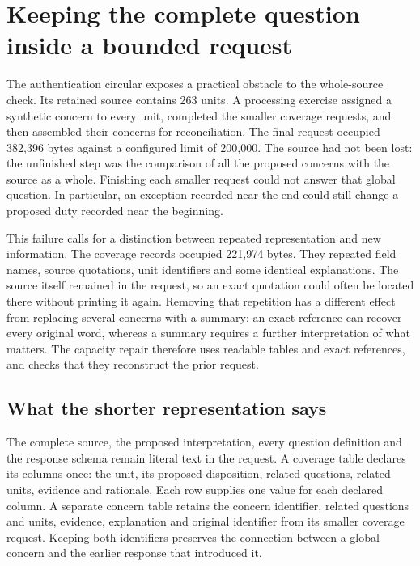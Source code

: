 \section{Keeping the complete question inside a bounded request}
\label{sec:lossless-context}

The authentication circular exposes a practical obstacle to the whole-source
check. Its retained source contains 263 units. A processing exercise assigned a
synthetic concern to every unit, completed the smaller coverage requests, and
then assembled their concerns for reconciliation. The final request occupied
382,396 bytes against a configured limit of 200,000. The source had not been
lost: the unfinished step was the comparison of all the proposed concerns with
the source as a whole. Finishing each smaller request could not answer that
global question. In particular, an exception recorded near the end could still
change a proposed duty recorded near the beginning.

This failure calls for a distinction between repeated representation and new
information. The coverage records occupied 221,974 bytes. They repeated field
names, source quotations, unit identifiers and some identical explanations.
The source itself remained in the request, so an exact quotation could often be
located there without printing it again. Removing that repetition has a
different effect from replacing several concerns with a summary: an exact
reference can recover every original word, whereas a summary requires a further
interpretation of what matters. The capacity repair therefore uses readable
tables and exact references, and checks that they reconstruct the prior request.

\subsection{What the shorter representation says}

The complete source, the proposed interpretation, every question definition and
the response schema remain literal text in the request. A coverage table
declares its columns once: the unit, its proposed disposition, related questions,
related units, evidence and rationale. Each row supplies one value for each
declared column. A separate concern table retains the concern identifier, related
questions and units, evidence, explanation and original identifier from its
smaller coverage request. Keeping both identifiers preserves the connection
between a global concern and the earlier response that introduced it.

